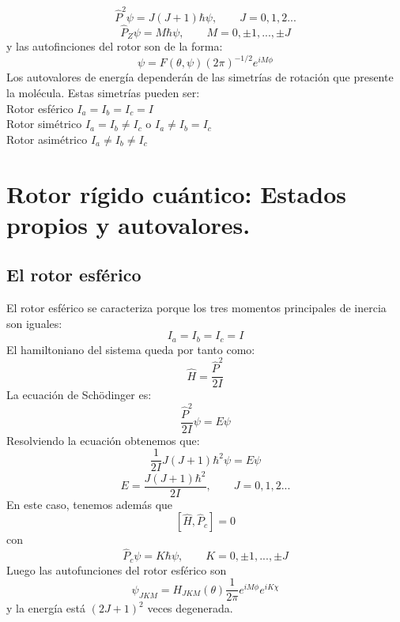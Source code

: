 \documentclass[a4paper]{article}
\begin{document}
\begin{equation}
\hat P^2\psi = J(J+1)\hbar \psi, \qquad J=0,1,2...
\end{equation}
\begin{equation}
\hat P_Z\psi = M\hbar\psi, \qquad M = 0,\pm 1,...,\pm J
\end{equation}
y las autofinciones del rotor son de la forma:
\begin{equation}
\psi = F(\theta, \psi)(2\pi)^{-1/2}e^{iM\phi}
\end{equation}
Los autovalores de energía dependerán de las simetrías de rotación que presente la molécula. Estas simetrías pueden ser:\\
Rotor esférico $I_a=I_b=I_c= I$ \\
Rotor simétrico $I_a=I_b \neq I_c$ o $I_a\neq I_b=I_c$\\
Rotor asimétrico $I_a \neq I_b \neq I_c$\\
\section{Rotor rígido cuántico: Estados propios y autovalores.}
\subsection{El rotor esférico}
El rotor esférico se caracteriza porque los tres momentos principales de inercia son iguales: $$I_a=I_b=I_c= I$$
El hamiltoniano del sistema queda por tanto como:
\begin{equation}
\hat H = \frac{\hat P^2}{2I}
\end{equation}
La ecuación de Schödinger es:
\begin{equation}
\frac{\hat P^2}{2I} \psi = E\psi
\end{equation}
Resolviendo la ecuación obtenemos que:$$\frac{1}{2I}J(J+1)\hbar^2\psi=E\psi$$
\begin{equation}
E=\frac{J(J+1)\hbar^2}{2I}, \qquad J=0,1,2...
\end{equation}
En este caso, tenemos además que
\begin{equation}
\left[\hat H,\hat P_c \right]=0
\end{equation}
con $$\hat P_c \psi = K\hbar\psi, \qquad K = 0, \pm 1,..., \pm J$$
Luego las autofunciones del rotor esférico son
\begin{equation}
\psi_{JKM}=H_{JKM}(\theta)\frac{1}{2\pi}e^{iM\phi}e^{iK\chi}
\end{equation}
y la energía está $(2J+1)^2$ veces degenerada.
\end{document}
